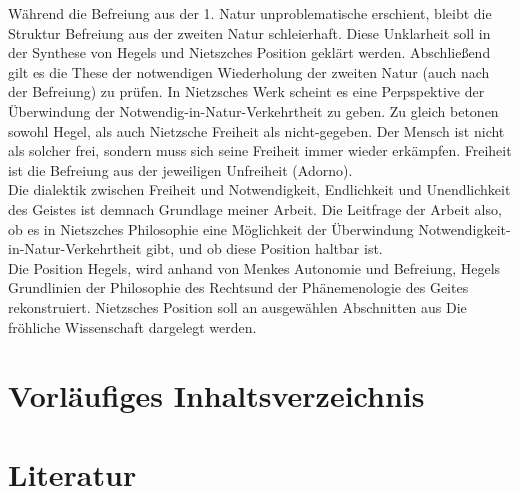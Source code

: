 \documentclass[a4paper, 12pt]{article}
\begin{document}
Während die Befreiung aus der 1. Natur unproblematische erschient, bleibt die Struktur Befreiung aus der zweiten Natur schleierhaft.
Diese Unklarheit soll in der Synthese von Hegels und Nietszches Position geklärt werden. 
Abschließend gilt es die These der notwendigen Wiederholung der zweiten Natur (auch nach der Befreiung) zu prüfen. 
In Nietzsches Werk scheint es eine Perpspektive der Überwindung der Notwendig-in-Natur-Verkehrtheit zu geben. 
Zu gleich betonen sowohl Hegel, als auch Nietzsche Freiheit als nicht-gegeben. 
Der Mensch ist nicht als solcher frei, sondern muss sich seine Freiheit immer wieder erkämpfen.
Freiheit ist die Befreiung aus der jeweiligen Unfreiheit (Adorno).\\
Die dialektik zwischen Freiheit und Notwendigkeit, Endlichkeit und Unendlichkeit des Geistes ist demnach Grundlage meiner Arbeit.
Die Leitfrage der Arbeit also, ob es in Nietszches Philosophie eine Möglichkeit der Überwindung Notwendigkeit-in-Natur-Verkehrtheit gibt, und ob diese Position haltbar ist.\\
Die Position Hegels, wird anhand von Menkes \glqq Autonomie und Befreiung\grqq, Hegels \glqq Grundlinien der Philosophie des Rechts\grqq und der \glqq Phänemenologie des Geites\grqq{} rekonstruiert.
Nietzsches Position soll an ausgewählen Abschnitten aus \glqq Die fröhliche Wissenschaft\grqq{} dargelegt werden.

\section{Vorläufiges Inhaltsverzeichnis}

\section{Literatur}

\printbibliography
 
\end{document}
